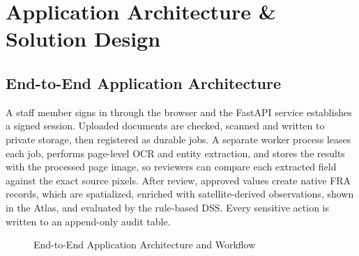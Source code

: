 \documentclass[11pt, a4paper]{article}
\begin{document}
\section{Application Architecture \& Solution Design}

\subsection{End-to-End Application Architecture}
\noindent
A staff member signs in through the browser and the FastAPI service establishes a signed session. Uploaded documents are checked, scanned and written to private storage, then registered as durable jobs. A separate worker process leases each job, performs page-level OCR and entity extraction, and stores the results with the processed page image, so reviewers can compare each extracted field against the exact source pixels. After review, approved values create native FRA records, which are spatialized, enriched with satellite-derived observations, shown in the Atlas, and evaluated by the rule-based DSS. Every sensitive action is written to an append-only audit table.

\begin{figure}[H]
    \centering
    \small
    \caption{End-to-End Application Architecture and Workflow}
\end{figure}
\end{document}
